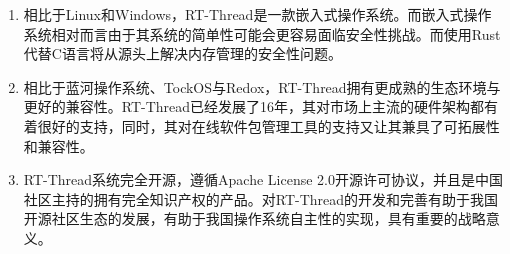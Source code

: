 \begin{enumerate}
  \item 相比于Linux和Windows，RT-Thread是一款嵌入式操作系统。而嵌入式操作系统相对而言由于其系统的简单性可能会更容易面临安全性挑战。而使用Rust代替C语言将从源头上解决内存管理的安全性问题。
  \item 相比于蓝河操作系统、TockOS与Redox，RT-Thread拥有更成熟的生态环境与更好的兼容性。RT-Thread已经发展了16年，其对市场上主流的硬件架构都有着很好的支持，同时，其对在线软件包管理工具的支持又让其兼具了可拓展性和兼容性。
  \item RT-Thread系统完全开源，遵循Apache License 2.0开源许可协议，并且是中国社区主持的拥有完全知识产权的产品。对RT-Thread的开发和完善有助于我国开源社区生态的发展，有助于我国操作系统自主性的实现，具有重要的战略意义。
\end{enumerate}